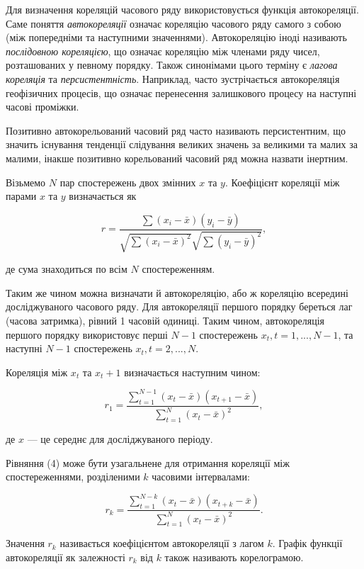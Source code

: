 \documentclass[
  letterpaper,
]{report}
\begin{document}
Для визначення кореляцій часового ряду використовується функція
автокореляції. Саме поняття \emph{автокореляції} означає кореляцію
часового ряду самого з собою (між попередніми та наступними значеннями).
Автокореляцію іноді називають \emph{послідовною кореляцією}, що означає
кореляцію між членами ряду чисел, розташованих у певному порядку. Також
синонімами цього терміну є \emph{лагова кореляція} та
\emph{персистентність}. Наприклад, часто зустрічається автокореляція
геофізичних процесів, що означає перенесення залишкового процесу на
наступні часові проміжки.

Позитивно автокорельований часовий ряд часто називають персистентним, що
значить існування тенденції слідування великих значень за великими та
малих за малими, інакше позитивно корельований часовий ряд можна назвати
інертним.

Візьмемо \(N\) пар спостережень двох змінних \(x\) та \(y\). Коефіцієнт
кореляції між парами \(x\) та \(y\) визначається як

\[
    r = \frac{\sum \left( x_i - \bar{x} \right) \left( y_i - \bar{y} \right)}{\sqrt{\sum \left( x_i - \bar{x} \right)^{2}} \sqrt{\sum \left( y_i - \bar{y} \right)^{2}}}, \tag{3}
\]

де сума знаходиться по всім \(N\) спостереженням.

Таким же чином можна визначати й автокореляцію, або ж кореляцію
всередині досліджуваного часового ряду. Для автокореляції першого
порядку береться лаг (часова затримка), рівний 1 часовій одиниці. Таким
чином, автокореляція першого порядку використовує перші \(N−1\)
спостережень \(x_t, t = 1,..., N−1\), та наступні \(N−1\) спостережень
\(x_t , t = 2,..., N\).

Кореляція між \(x_t\) та \(x_t + 1\) визначається наступним чином:

\[
r_1 = \frac{\sum_{t=1}^{N-1} \left( x_t - \bar{x} \right) \left( x_{t+1} - \bar{x} \right)}{\sum_{t=1}^{N}\left( x_t - \bar{x} \right)^2}, \tag{4}
\]

де \(x\) --- це середнє для досліджуваного періоду.

Рівняння (4) може бути узагальнене для отримання кореляції між
спостереженнями, розділеними \(k\) часовими інтервалами:

\[
    r_k = \frac{\sum_{t=1}^{N-k} \left( x_t - \bar{x} \right) \left( x_{t+k} - \bar{x} \right)}{\sum_{t=1}^{N}\left( x_t - \bar{x} \right)^2}. \tag{4}
\]

Значення \(r_k\) називається коефіцієнтом автокореляції з лагом \(k\).
Графік функції автокореляції як залежності \(r_k\) від \(k\) також
називають корелограмою.
\end{document}
